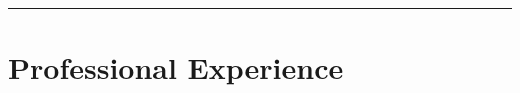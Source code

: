 \documentclass[a4paper,12pt]{report}
\begin{document}
%
%
%
%
%
%
%
%





\vspace{0.2cm}
\hrule

\vspace{0.5cm}
\section*{Professional Experience}
\end{document}
